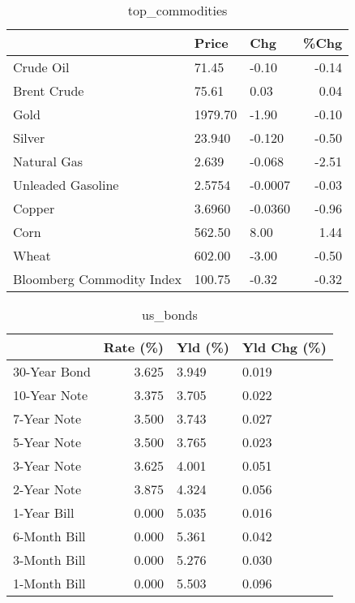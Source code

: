 \documentclass{article}%
\begin{document}
\begin{table}[htbp]%
\caption{top\_commodities}%
\centering%
\begin{adjustbox}{width=1\textwidth}%
\begin{tabular}{lllr}
\toprule
                          &   Price &     Chg &  \%Chg \\
\midrule
               Crude Oil  &   71.45 &   -0.10 & -0.14 \\
             Brent Crude  &   75.61 &    0.03 &  0.04 \\
                    Gold  & 1979.70 &   -1.90 & -0.10 \\
                  Silver  &  23.940 &  -0.120 & -0.50 \\
             Natural Gas  &   2.639 &  -0.068 & -2.51 \\
       Unleaded Gasoline  &  2.5754 & -0.0007 & -0.03 \\
                  Copper  &  3.6960 & -0.0360 & -0.96 \\
                    Corn  &  562.50 &    8.00 &  1.44 \\
                   Wheat  &  602.00 &   -3.00 & -0.50 \\
Bloomberg Commodity Index &  100.75 &   -0.32 & -0.32 \\
\bottomrule
\end{tabular}
%
\end{adjustbox}%
\end{table}

%


\begin{table}[htbp]%
\caption{us\_bonds}%
\centering%
\begin{adjustbox}{width=1\textwidth}%
\begin{tabular}{lrll}
\toprule
             &  Rate (\%) & Yld (\%) & Yld Chg (\%) \\
\midrule
30-Year Bond &     3.625 &   3.949 &       0.019 \\
10-Year Note &     3.375 &   3.705 &       0.022 \\
 7-Year Note &     3.500 &   3.743 &       0.027 \\
 5-Year Note &     3.500 &   3.765 &       0.023 \\
 3-Year Note &     3.625 &   4.001 &       0.051 \\
 2-Year Note &     3.875 &   4.324 &       0.056 \\
 1-Year Bill &     0.000 &   5.035 &       0.016 \\
6-Month Bill &     0.000 &   5.361 &       0.042 \\
3-Month Bill &     0.000 &   5.276 &       0.030 \\
1-Month Bill &     0.000 &   5.503 &       0.096 \\
\bottomrule
\end{tabular}
%
\end{adjustbox}%
\end{table}
\end{document}
